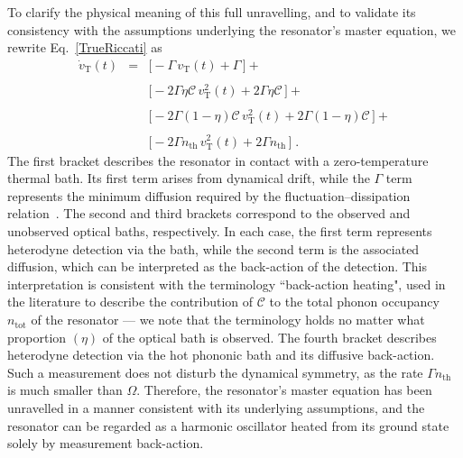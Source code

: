 \documentclass[./Main-revtex.tex]{subfiles}
\begin{document}
To clarify the physical meaning of this full unravelling, and to validate its consistency with the assumptions underlying the resonator’s master equation, we rewrite Eq.~\eqref{TrueRiccati} as
\begin{equation}
\begin{array}{lcl}
    \dot{v}_\text{T}(t) & = & \bigg[-\Gamma\,v_\text{T}(t)+\Gamma\,\bigg] + \\\\ && \bigg[-2 \Gamma\eta \mathcal{C}\,v^2_\text{T}(t)+2\Gamma\eta \mathcal{C}\,\bigg] + \\\\ && \bigg[ -2 \Gamma (1 - \eta) \mathcal{C}\,v^2_\text{T}(t)+2\Gamma (1 - \eta) \mathcal{C}\,\bigg] + \\\\ && \bigg[-2 \Gamma n_\text{th}\,v^2_\text{T}(t)+2\Gamma n_\text{th}\,\bigg]\;.
    \end{array}
\end{equation}
The first bracket describes the resonator in contact with a zero-temperature thermal bath. Its first term arises from dynamical drift, while the $\Gamma$ term represents the minimum diffusion required by the fluctuation–dissipation relation~\cite{wiseman2009quantum}. The second and third brackets correspond to the observed and unobserved optical baths, respectively. In each case, the first term represents heterodyne detection via the bath, while the second term is the associated diffusion, which can be interpreted as the back-action of the detection. This interpretation is consistent with the terminology ``back-action heating", used in the literature to describe the contribution of $\mathcal{C}$ to the total phonon occupancy $n_\text{tot}$ of the resonator --- we note that the terminology holds no matter what proportion $(\eta)$ of the optical bath is observed. The fourth bracket describes heterodyne detection via the hot phononic bath and its diffusive back-action. Such a measurement does not disturb the dynamical symmetry, as the rate $\Gamma n_\text{th}$ is much smaller than $\Omega$. Therefore, the resonator’s master equation has been unravelled in a manner consistent with its underlying assumptions, and the resonator can be regarded as a harmonic oscillator heated from its ground state solely by measurement back-action.
\end{document}
